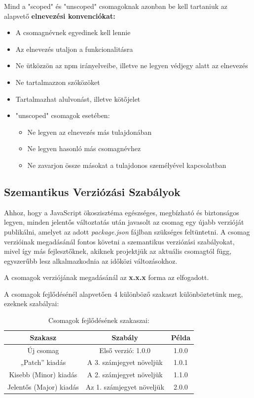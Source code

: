 	Mind a "scoped" és "unscoped" csomagoknak azonban be kell tartaniuk az alapvető \textbf{elnevezési konvenciókat:}
	
	\begin{itemize}
		\item A csomagnévnek egyedinek kell lennie
		\item Az elnevezés utaljon a funkcionalitásra
		\item Ne ütközzön az npm irányelveibe, illetve ne legyen védjegy alatt az elnevezés
		\item Ne tartalmazzon szóközöket
		\item Tartalmazhat alulvonást, illetve kötőjelet
		\item "unscoped" csomagok esetében:
		\begin{itemize}
			\item Ne legyen az elnevezés más tulajdonában
			\item Ne legyen hasonló más csomagnévhez
			\item Ne zavarjon össze másokat a tulajdonos személyével kapcsolatban
		\end{itemize}
	\end{itemize}

	\begin{flushright}
		\cite{npm-scope} \cite{npm-naming}
	\end{flushright}

	\subsection{Szemantikus Verziózási Szabályok}
	
	Ahhoz, hogy a JavaScript ökoszisztéma egészséges, megbízható és biztonságos legyen, minden jelentős változtatás után javasolt az csomag egy újabb verzióját publikálni, amelyet az adott \emph{package.json} fájlban szükséges feltüntetni. A csomag verzióinak megadásánál fontos követni a szemantikus verziózási szabályokat, mivel így más fejlesztőknek, akiknek projektjük az aktuális csomagtól függ, egyszerűbb lesz alkalmazkodnia az időközi változásokhoz.
	
	A csomagok verziójának megadásánál az \textbf{x.x.x} forma az elfogadott.
	
	A csomagok fejlődésénél alapvetően 4 különböző szakaszt különböztetünk meg, ezeknek szabályai:
	
	\begin{table}[h]
		\centering
		\caption{Csomagok fejlődésének szakaszai:}
		\label{tab:package-lifecycle}
		\begin{tabular}{|c|c|c|}
			\hline
			\textbf{Szakasz} & \textbf{Szabály} & \textbf{Példa} \\
			\hline
			Új csomag & Első verzió: 1.0.0 & 1.0.0 \\
			\hline
			„Patch” kiadás & A 3. számjegyet növeljük & 1.0.1 \\
			\hline
			Kisebb (Minor) kiadás & A 2. számjegyet növeljük & 1.1.0 \\
			\hline
			Jelentős (Major) kiadás & Az 1. számjegyet növeljük & 2.0.0 \\
			\hline
		\end{tabular}
	\end{table}

